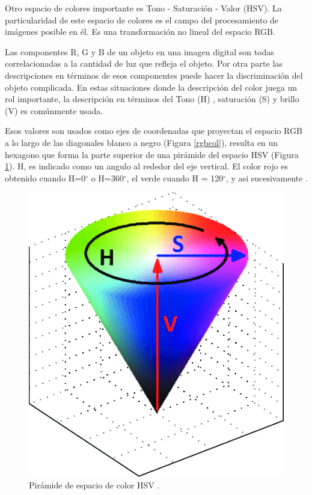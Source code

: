 \documentclass[twoside,spanish,ESP,MSc]{plantillaLabUPV}
\theoremstyle{definition}
\begin{document}
Otro espacio de colores importante es Tono - Saturación - Valor (HSV). La particularidad de este espacio de colores es el campo del procesamiento de imágenes posible en él. Es una transformación no lineal del espacio RGB.

Las componentes R, G y B de un objeto en una imagen digital son todas correlacionadas a la cantidad de luz que refleja el objeto. Por otra parte las descripciones en términos de esos componentes puede hacer la discriminación del objeto complicada. En estas situaciones donde la descripción del color juega un rol importante, la descripción en términos del Tono (H) , saturación (S) y brillo (V) es comúnmente usada.

Esos valores son usados como ejes de coordenadas que proyectan el espacio RGB a lo largo de las diagonales blanco a negro (Figura \ref{rgbcol}), resulta en un hexagono que forma la parte superior de una pirámide del espacio HSV (Figura \ref{hsvcol}). H, es indicado como un angulo al rededor del eje vertical. El color rojo es obtenido cuando H=0$^{\circ}$ o H=360$^{\circ}$, el verde cuando H = 120$^{\circ}$, y asi sucesivamente \cite{Koschan:2008:DCI:1370941}.

\begin{figure}[!tbh] 
	\centering 
		\includegraphics[scale=.35]{ima/hsvcol} 
	\caption{Pirámide de espacio de color HSV \cite{hsvspace}.} 
	\label{hsvcol} 
\end{figure}
\end{document}
